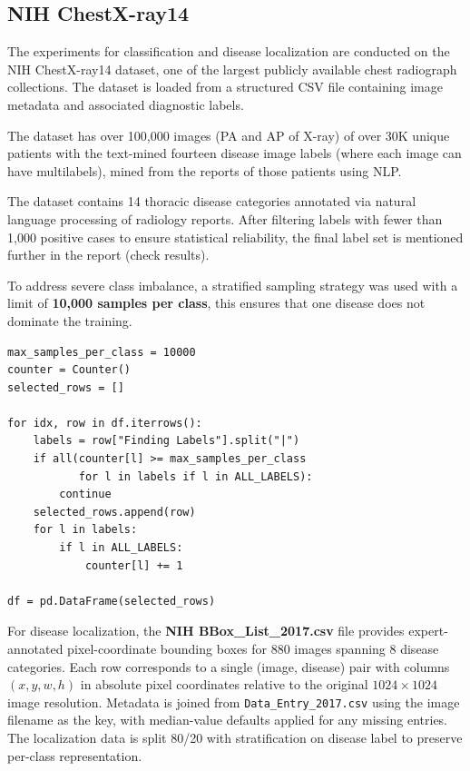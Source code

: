 \subsection{NIH ChestX-ray14}

The experiments for classification and disease localization are conducted on the NIH ChestX-ray14 dataset, one of the largest publicly available chest radiograph collections. The dataset is loaded from a structured CSV file containing image metadata and associated diagnostic labels.

The dataset has over 100,000 images (PA and AP of X-ray) of over 30K unique patients with the text-mined fourteen disease image labels (where each image can have multilabels), mined from the reports of those patients using NLP.

The dataset contains 14 thoracic disease categories annotated via natural language processing of radiology reports. After filtering labels with fewer than 1,000 positive cases to ensure statistical reliability, the final label set is mentioned further in the report (check results).

To address severe class imbalance, a stratified sampling strategy was used with a limit of \textbf{10,000 samples per class}, this ensures that one disease does not dominate the training.

\begin{lstlisting}[style=pythonstyle, caption={Stratified sampling with class cap}]
max_samples_per_class = 10000
counter = Counter()
selected_rows = []

for idx, row in df.iterrows():
    labels = row["Finding Labels"].split("|")
    if all(counter[l] >= max_samples_per_class
           for l in labels if l in ALL_LABELS):
        continue
    selected_rows.append(row)
    for l in labels:
        if l in ALL_LABELS:
            counter[l] += 1

df = pd.DataFrame(selected_rows)
\end{lstlisting}

For disease localization, the \textbf{NIH BBox\_List\_2017.csv} file provides expert-annotated pixel-coordinate bounding boxes for 880 images spanning 8 disease categories. Each row corresponds to a single (image, disease) pair with columns $(x, y, w, h)$ in absolute pixel coordinates relative to the original $1024 \times 1024$ image resolution. Metadata is joined from \texttt{Data\_Entry\_2017.csv} using the image filename as the key, with median-value defaults applied for any missing entries. The localization data is split 80/20 with stratification on disease label to preserve per-class representation.

